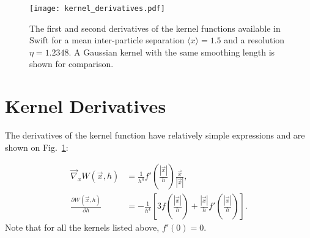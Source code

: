 \documentclass[fleqn, usenatbib, useAMS,a4paper]{mnras}
\newcommand{\swift}{{\sc Swift}\xspace}
\begin{document}
\begin{figure}
\texttt{[image: kernel\_derivatives.pdf]}
\caption{The first and second derivatives of the kernel functions
  available in \swift for a mean inter-particle separation $\langle
  x\rangle=1.5$ and a resolution $\eta=1.2348$.  A Gaussian kernel
  with the same smoothing length is shown for comparison.}
\label{fig:sph:kernel_derivatives}
\end{figure}


\section{Kernel Derivatives}

The derivatives of the kernel function have relatively simple
expressions and are shown on Fig.~\ref{fig:sph:kernel_derivatives}:

\begin{align}
 \vec\nabla_x W(\vec{x},h) &= \frac{1}{h^4}f'\left(\frac{|\vec{x}|}{h}\right) \frac{\vec{x}}{|\vec{x}|}, \\
 \frac{\partial W(\vec{x},h)}{\partial h} &=- \frac{1}{h^4}\left[3f\left(\frac{|\vec{x}|}{h}\right) + 
\frac{|\vec{x}|}{h}f'\left(\frac{|\vec{x}|}{h}\right)\right].
\end{align}
Note that for all the kernels listed above, $f'(0) = 0$. 



\end{document}
